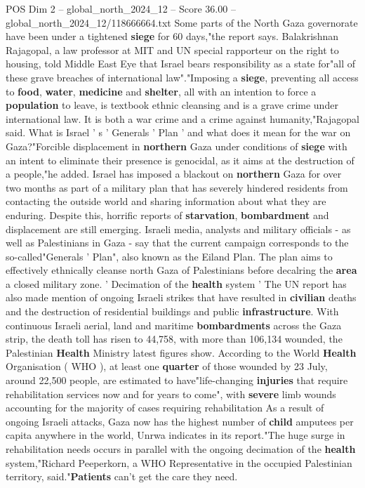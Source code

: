 \begin{textsample}{POS Dim 2 – global\_north\_2024\_12 – Score 36.00 – global\_north\_2024\_12/118666664.txt}
Some parts of the North Gaza governorate have been under a tightened \textbf{siege} for 60 days,"the report says.
Balakrishnan Rajagopal, a law professor at MIT and UN special rapporteur on the right to housing, told Middle East Eye that Israel bears responsibility as a state for"all of these grave breaches of international law"."Imposing a \textbf{siege}, preventing all access to \textbf{food}, \textbf{water}, \textbf{medicine} and \textbf{shelter}, all with an intention to force a \textbf{population} to leave, is textbook ethnic cleansing and is a grave crime under international law.
It is both a war crime and a crime against humanity,"Rajagopal said.
What is Israel ' s ' Generals ' Plan ' and what does it mean for the war on Gaza?"Forcible displacement in \textbf{northern} Gaza under conditions of \textbf{siege} with an intent to eliminate their presence is genocidal, as it aims at the destruction of a people,"he added.
Israel has imposed a blackout on \textbf{northern} Gaza for over two months as part of a military plan that has severely hindered residents from contacting the outside world and sharing information about what they are enduring.
Despite this, horrific reports of \textbf{starvation}, \textbf{bombardment} and displacement are still emerging.
Israeli media, analysts and military officials - as well as Palestinians in Gaza - say that the current campaign corresponds to the so-called"Generals ' Plan", also known as the Eiland Plan.
The plan aims to effectively ethnically cleanse north Gaza of Palestinians before decalring the \textbf{area} a closed military zone. ' Decimation of the \textbf{health} system ' The UN report has also made mention of ongoing Israeli strikes that have resulted in \textbf{civilian} deaths and the destruction of residential buildings and public \textbf{infrastructure}.
With continuous Israeli aerial, land and maritime \textbf{bombardments} across the Gaza strip, the death toll has risen to 44,758, with more than 106,134 wounded, the Palestinian \textbf{Health} Ministry latest figures show.
According to the World \textbf{Health} Organisation ( WHO ), at least one \textbf{quarter} of those wounded by 23 July, around 22,500 people, are estimated to have"life-changing \textbf{injuries} that require rehabilitation services now and for years to come", with \textbf{severe} limb wounds accounting for the majority of cases requiring rehabilitation As a result of ongoing Israeli attacks, Gaza now has the highest number of \textbf{child} amputees per capita anywhere in the world, Unrwa indicates in its report."The huge surge in rehabilitation needs occurs in parallel with the ongoing decimation of the \textbf{health} system,"Richard Peeperkorn, a WHO Representative in the occupied Palestinian territory, said."\textbf{Patients} can't get the care they need.

\end{textsample}
